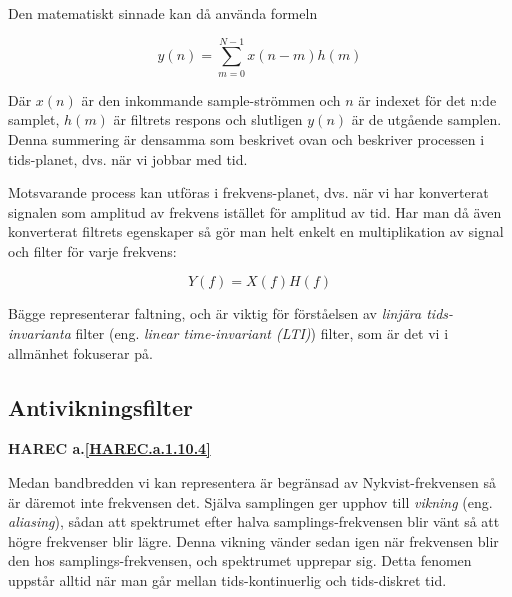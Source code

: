 Den matematiskt sinnade kan då använda formeln

\[
	y(n) = \sum_{m=0}^{N-1} x(n-m)h(m)
\]

Där \(x(n)\) är den inkommande sample-strömmen och \(n\) är indexet för det
n:de samplet, \(h(m)\) är filtrets respons och slutligen \(y(n)\) är de utgående
samplen.
Denna summering är densamma som beskrivet ovan och beskriver processen
i tids-planet, dvs. när vi jobbar med tid.

Motsvarande process kan utföras i frekvens-planet, dvs. när vi har konverterat
signalen som amplitud av frekvens istället för amplitud av tid.
Har man då även konverterat filtrets egenskaper så gör man helt enkelt en
multiplikation av signal och filter för varje frekvens:

\[
	Y(f) = X(f)H(f)
\]

Bägge representerar faltning, och är viktig för förståelsen av \emph{linjära
tids-invarianta} filter (eng. \emph{linear time-invariant (LTI)}) filter,
som är det vi i allmänhet fokuserar på.

\subsection{Antivikningsfilter}
\textbf{HAREC a.\ref{HAREC.a.1.10.4}\label{myHAREC.a.1.10.4}}

Medan bandbredden vi kan representera är begränsad av Nykvist-frekvensen så
är däremot inte frekvensen det.
Själva samplingen ger upphov till \emph{vikning} (eng. \emph{aliasing}),
sådan att spektrumet efter halva samplings-frekvensen blir vänt så att högre
frekvenser blir lägre.
Denna vikning vänder sedan igen när frekvensen blir den hos
samplings-frekvensen, och spektrumet upprepar sig.
Detta fenomen uppstår alltid när man går mellan tids-kontinuerlig och
tids-diskret tid.

